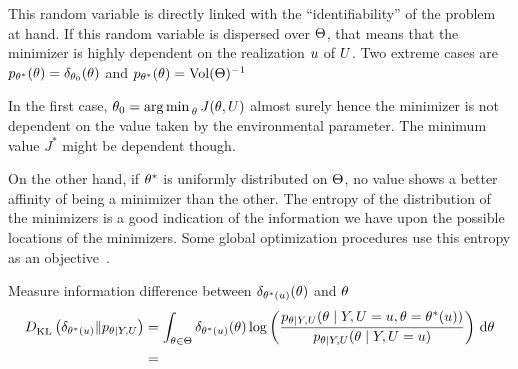 \documentclass[../../Main_ManuscritThese.tex]{subfiles}
\begin{document}
This random variable is directly linked with the ``identifiability'' of the problem at hand.
If this random variable is dispersed over $\Theta$, that means that the minimizer is highly dependent on the realization  $u$ of $U$. Two extreme cases are$ p_{\theta^*}(\theta) = \delta_{\theta_0}(\theta)$ and $ p_{\theta^*}(\theta) = \mathrm{Vol}(\Theta)^{-1}$

In the first case, $\theta_0 = \operatorname*{arg\,min \,}_{\theta} J(\theta, U)$ almost surely hence the minimizer is not dependent on the value taken by the environmental parameter. The minimum value $J^*$ might be dependent though.

On the other hand, if $\theta^*$ is uniformly distributed on $\Theta$, no value shows a better affinity of being a minimizer than the other.
The entropy of the distribution of the minimizers is a good indication of the information we have upon the possible locations of the minimizers. Some global optimization procedures use this entropy as an objective~\cite{villemonteix_informational_2006}.









Measure information difference between $\delta_{\theta^*(u)}(\theta)$ and $\theta$
\begin{align}
  D^{\mathrm{}}_{\mathrm{KL}}\left(\delta_{\theta^*(u)} \| p_{\theta \mid Y,U}\right) &= \int_{\theta \in \Theta} \delta_{\theta^*(u)}(\theta)\log\left(\frac{p_{\theta \mid Y, U}(\theta \mid Y, U=u, \theta=\theta^*(u))}{p_{\theta \mid Y, U}(\theta \mid Y, U=u)} \right) \, \mathrm{d}\theta \\
                                                &=
\end{align}

\subfileLocal{
	\pagestyle{empty}
	
	
      }
\end{document}
